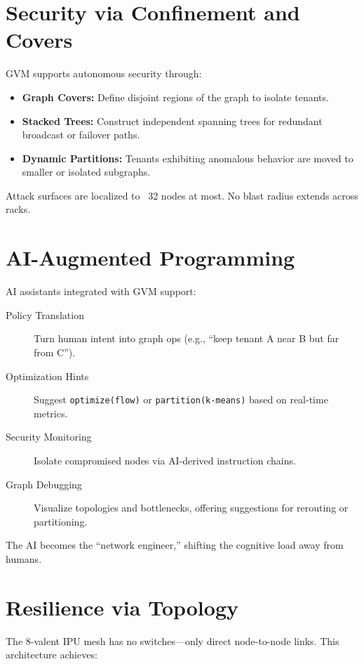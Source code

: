 \section{Security via Confinement and Covers}

GVM supports autonomous security through:

\begin{itemize}
  \item \textbf{Graph Covers:} Define disjoint regions of the graph to isolate tenants.
  \item \textbf{Stacked Trees:} Construct independent spanning trees for redundant broadcast or failover paths.
  \item \textbf{Dynamic Partitions:} Tenants exhibiting anomalous behavior are moved to smaller or isolated subgraphs.
\end{itemize}

Attack surfaces are localized to ~32 nodes at most. No blast radius extends across racks.

\section{AI-Augmented Programming}

AI assistants integrated with GVM support:

\begin{description}
  \item[Policy Translation] Turn human intent into graph ops (e.g., “keep tenant A near B but far from C”).
  \item[Optimization Hints] Suggest \texttt{optimize(flow)} or \texttt{partition(k-means)} based on real-time metrics.
  \item[Security Monitoring] Isolate compromised nodes via AI-derived instruction chains.
  \item[Graph Debugging] Visualize topologies and bottlenecks, offering suggestions for rerouting or partitioning.
\end{description}

The AI becomes the “network engineer,” shifting the cognitive load away from humans.

\section{Resilience via Topology}

The 8-valent IPU mesh has no switches—only direct node-to-node links. This architecture achieves:

